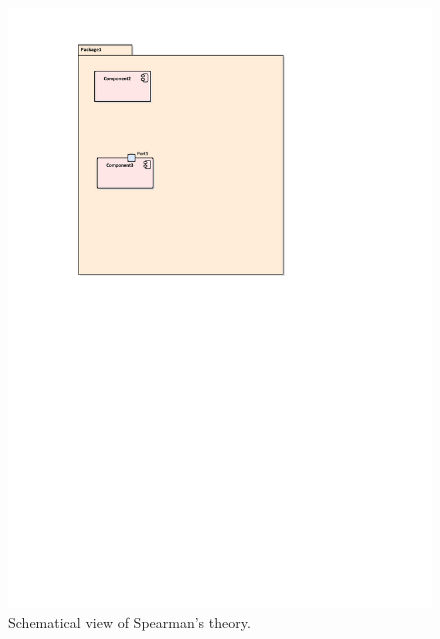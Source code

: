 \begin{figure}[h]
    \centering
    \includegraphics[width=1\textwidth]{dd.pdf}
    \caption{Schematical view of Spearman's theory.}
\end{figure}







